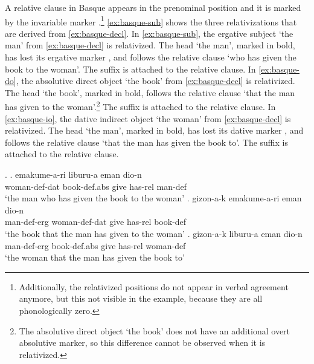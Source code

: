 A relative clause in Basque appears in the prenominal position and it is marked by the invariable marker .\footnote{
Additionally, the relativized positions do not appear in verbal agreement anymore, but this not visible in the example, because they are all phonologically zero.
}
\ref{ex:basque-sub} shows the three relativizations that are derived from \ref{ex:basque-decl}.
In \ref{ex:basque-sub}, the ergative subject  `the man' from \ref{ex:basque-decl} is relativized. The head  `the man', marked in bold, has lost its ergative marker , and follows the relative clause  `who has given the book to the woman'. The suffix  is attached to the relative clause.
In \ref{ex:basque-do}, the absolutive direct object  `the book' from \ref{ex:basque-decl} is relativized. The head  `the book', marked in bold, follows the relative clause  `that the man has given to the woman'.\footnote{
The absolutive direct object  `the book' does not have an additional overt absolutive marker, so this difference cannot be observed when it is relativized.
}
The suffix  is attached to the relative clause.
In \ref{ex:basque-io}, the dative indirect object  `the woman' from \ref{ex:basque-decl} is relativized. The head  `the man', marked in bold, has lost its dative marker , and follows the relative clause  `that the man has given the book to'. The suffix  is attached to the relative clause.

\ex.\label{ex:basque-rel}
\ag. emakume-a-ri liburu-a eman dio-n \\
 woman-\ac{def}-\ac{dat} book-\ac{def}.\ac{abs} give has-\ac{rel} man-\ac{def}\\
 `the man who has given the book to the woman'\label{ex:basque-sub}
\bg. gizon-a-k emakume-a-ri eman dio-n \\
 man-\ac{def}-\ac{erg} woman-\ac{def}-\ac{dat} give has-\ac{rel} book-\ac{def}\\
 `the book that the man has given to the woman'\label{ex:basque-do}
\bg. gizon-a-k liburu-a eman dio-n \\
 man-\ac{def}-\ac{erg} book-\ac{def}.\ac{abs} give has-\ac{rel} woman-\ac{def}\\
 `the woman that the man has given the book to' \label{ex:basque-io}

